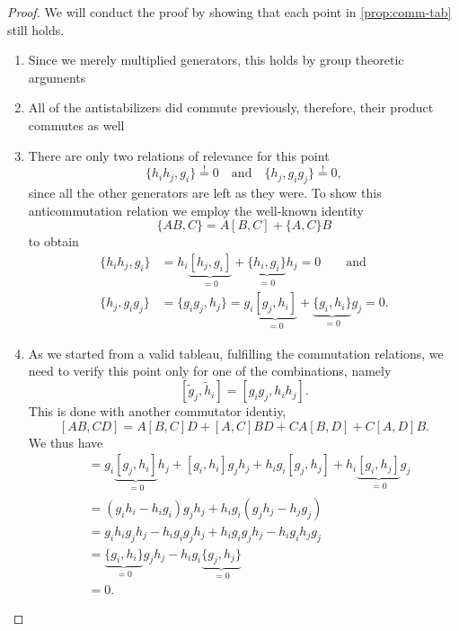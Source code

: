 \begin{proof}
  We will conduct the proof by showing that each point in \cref{prop:comm-tab}
  still holds.
  \begin{enumerate}
    \item Since we merely multiplied generators, this holds by group theoretic
      arguments
    \item All of the antistabilizers did commute previously, therefore, their
      product commutes as well
    \item There are only two relations of relevance for this point
      \[
        \{h_i h_j, g_i\} \overset{\text{!}}{=} 0 \quad{\text{and}} \quad 
        \{h_j, g_i g_j\} \overset{\text{!}}{=} 0, 
      \]
      since all the other generators are left as they were.
      To show this anticommutation relation we employ the well-known identity
      \[ \{AB,C\} = A[B,C] + \{A,C\}B \]
      to obtain
      \begin{align*}
        \{h_i h_j, g_i \} &= h_i \underbrace{[h_j, g_i]}_{=0} +
        \underbrace{\{h_i, g_i\}}_{=0} h_j = 0 \qquad{\text{and}} \\
        \{h_j, g_i g_j \} &= \{g_i g_j, h_j\} = g_i \underbrace{[g_j, h_i]}_{=0} +
        \underbrace{\{g_i, h_i\}}_{=0} g_j = 0
      .\end{align*}
    \item As we started from a valid tableau, fulfilling the commutation
      relations, we need to verify this point only for one of the combinations,
      namely \[ [\tilde{g}_j, \tilde{h}_i] = [ g_i g_j, h_i h_j]. \]
      This is done with another commutator identiy,
      \[
        [AB,CD] = A[B,C]D + [A,C]BD + CA[B,D] + C[A,D]B.
      \]
      We thus have
      \begin{align*}
        [g_i g_j, h_i h_j] &=
          g_i \underbrace{[g_j, h_i]}_{=0} h_j + [g_i, h_i] g_j h_j + h_i g_i
          [g_j, h_j] + h_i \underbrace{[g_i, h_j]}_{=0} g_j \\
           &= (g_i h_i - h_i g_i)g_j h_j + h_i g_i (g_j h_j - h_j g_j) \\
           &= g_i h_i g_j h_j - h_i g_i g_j h_j + h_i g_i g_j h_j - h_i g_i h_j
           g_j \\
           &= \underbrace{\{g_i, h_i\}}_{=0} g_j h_j - h_i g_i
           \underbrace{\{g_j, h_j\}}_{=0} \\
           &= 0
      .\end{align*}
  \end{enumerate}
\end{proof}

